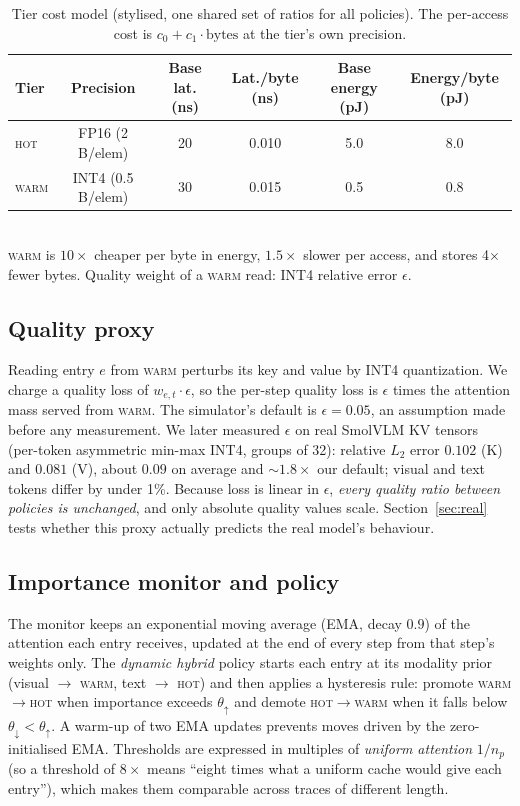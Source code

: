 \documentclass[10pt,a4paper]{article}
\newcommand{\hot}{\textsc{hot}}
\newcommand{\warm}{\textsc{warm}}
\begin{document}
\begin{table}[t]
\centering\small
\caption{Tier cost model (stylised, one shared set of ratios for all policies). The per-access cost is $c_0 + c_1\cdot\text{bytes}$ at the tier's own precision.}
\label{tab:tiers}
\begin{tabular}{lccccc}
\toprule
Tier & Precision & Base lat. (ns) & Lat./byte (ns) & Base energy (pJ) & Energy/byte (pJ)\\
\midrule
\hot{}  & FP16 (2 B/elem) & 20 & 0.010 & 5.0 & 8.0\\
\warm{} & INT4 (0.5 B/elem) & 30 & 0.015 & 0.5 & 0.8\\
\bottomrule
\end{tabular}
\\[2pt]
{\footnotesize \warm{} is $10\times$ cheaper per byte in energy, $1.5\times$ slower per access, and stores 4$\times$ fewer bytes. Quality weight of a \warm{} read: INT4 relative error $\epsilon$.}
\end{table}

\subsection{Quality proxy}
Reading entry $e$ from \warm{} perturbs its key and value by INT4 quantization. We charge a quality loss of $w_{e,t}\cdot\epsilon$, so the per-step quality loss is $\epsilon$ times the attention mass served from \warm{}. The simulator's default is $\epsilon{=}0.05$, an assumption made before any measurement. We later measured $\epsilon$ on real SmolVLM KV tensors (per-token asymmetric min-max INT4, groups of 32): relative $L_2$ error $0.102$ (K) and $0.081$ (V), about $0.09$ on average and $\sim\!1.8\times$ our default; visual and text tokens differ by under 1\%. Because loss is linear in $\epsilon$, \emph{every quality ratio between policies is unchanged}, and only absolute quality values scale. Section~\ref{sec:real} tests whether this proxy actually predicts the real model's behaviour.

\subsection{Importance monitor and policy}
The monitor keeps an exponential moving average (EMA, decay $0.9$) of the attention each entry receives, updated at the end of every step from that step's weights only. The \emph{dynamic hybrid} policy starts each entry at its modality prior (visual $\rightarrow$ \warm{}, text $\rightarrow$ \hot{}) and then applies a hysteresis rule: promote \warm{}$\to$\hot{} when importance exceeds $\theta_{\uparrow}$ and demote \hot{}$\to$\warm{} when it falls below $\theta_{\downarrow}<\theta_{\uparrow}$. A warm-up of two EMA updates prevents moves driven by the zero-initialised EMA. Thresholds are expressed in multiples of \emph{uniform attention} $1/n_p$ (so a threshold of $8\times$ means ``eight times what a uniform cache would give each entry''), which makes them comparable across traces of different length.
\end{document}
